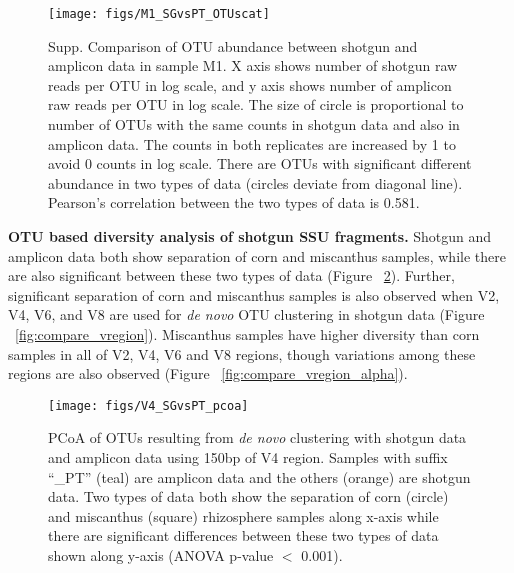 \documentclass[12pt]{article}
\begin{document}
\begin{figure}[tbph!]
  \centering
  \texttt{[image: figs/M1\_SGvsPT\_OTUscat]}

  \caption[Comparison of OTU abundance between shotgun and amplicon
  data in sample M1. ]{Supp. Comparison of OTU abundance between
  shotgun and amplicon data in sample M1. X axis shows number of
  shotgun raw reads per OTU in log scale, and y axis shows number of
  amplicon raw reads per OTU in log scale. The size of circle is
  proportional to number of OTUs with the same counts in shotgun data
  and also in amplicon data. The counts in both replicates are
  increased by 1 to avoid 0 counts in log scale. There are OTUs with
  significant different abundance in two types of data (circles
  deviate from diagonal line). Pearson's correlation between the two types
  of data is 0.581.}

  \label{fig:M1_SGvsPT_OTUscat}
\end{figure}

{\bf OTU based diversity analysis of shotgun SSU fragments. }  Shotgun
and amplicon data both show separation of corn and miscanthus samples,
while there are also significant between these two types of data
(Figure ~\ref{fig:V4_SGvsPT_pcoa}). Further, significant separation of
corn and miscanthus samples is also observed when V2, V4, V6, and V8
are used for {\em de novo} OTU clustering in shotgun data (Figure
~\ref{fig:compare_vregion}). Miscanthus samples have higher diversity
than corn samples in all of V2, V4, V6 and V8 regions, though
variations among these regions are also observed (Figure
~\ref{fig:compare_vregion_alpha}).

\begin{figure}[tbph!]
  \centering
  \texttt{[image: figs/V4\_SGvsPT\_pcoa]}

  \caption[PCoA of OTUs resulting from {\em de novo} clustering with
  shotgun data and amplicon data using 150bp of V4 region]{PCoA of
  OTUs resulting from {\em de novo} clustering with shotgun data and
  amplicon data using 150bp of V4 region. Samples with suffix ``\_PT''
  (teal) are amplicon data and the others (orange) are shotgun
  data. Two types of data both show the separation of corn (circle)
  and miscanthus (square) rhizosphere samples along x-axis while there
  are significant differences between these two types of data shown
  along y-axis (ANOVA p-value $<$ 0.001).}

  \label{fig:V4_SGvsPT_pcoa}
\end{figure}
\end{document}
